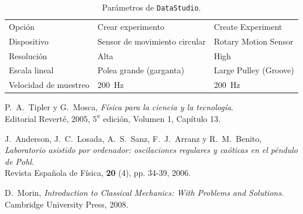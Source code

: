 \documentclass[11pt]{articulo}
\begin{document}
\begin{table}[h!]
  \centering
  \begin{tabular}{l l l}
    \hline
    Opci\'on              & Crear experimento             & Create Experiment     \\
    Dispositivo           & Sensor de movimiento circular & Rotary Motion Sensor  \\
    Resoluci\'on          & Alta                          & High                  \\
    Escala lineal         & Polea grande (garganta)       & Large Pulley (Groove) \\
    Velocidad de muestreo & 200~Hz                        & 200~Hz                \\
    \hline
  \end{tabular}
  \caption{Par\'ametros de {\tt DataStudio}.}
  \label{tabla:data-studio}
\end{table}



\begin{thebibliography}{X}

  P.~A.~Tipler y G.~Mosca,
  \textit{F\'isica para la ciencia y la tecnolog\'ia}.\\
  Editorial Revert\'e, 2005, $5^{a}$ edici\'on, Volumen 1, Cap\'itulo 13.

  J.~Anderson, J.~C.~Losada, A.~S.~Sanz, F.~J.~Arranz y R.~M.~Benito,
  \textit{Laboratorio asistido por ordenador: oscilaciones regulares y ca\'oticas en el p\'endulo de Pohl}.\\
  Revista Espa\~nola de F\'isica, {\bf 20} (4), pp. 34-39, 2006.

  D.~Morin,
  \textit{Introduction to Classical Mechanics: With Problems and Solutions}.\\
  Cambridge University Press, 2008.

\end{thebibliography}


\end{document}
